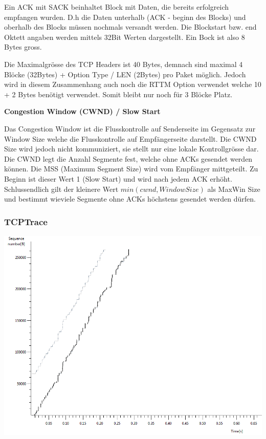 Ein ACK mit SACK beinhaltet Block mit Daten, die bereits erfolgreich empfangen
wurden. D.h die Daten unterhalb (ACK - beginn des Blocks) und oberhalb des
Blocks müssen nochmals versandt werden. Die Blockstart bzw. end Oktett angaben
werden mittels 32Bit Werten dargestellt. Ein Bock ist also 8 Bytes gross.

Die Maximalgrösse des TCP Headers ist 40 Bytes, demnach sind maximal 4 Blöcke
(32Bytes) + Option Type / LEN (2Bytes) pro Paket möglich. Jedoch wird in diesem
Zusammenhang auch noch die RTTM Option verwendet welche 10 + 2 Bytes benötigt
verwendet. Somit bleibt nur noch für 3 Blöcke Platz.

\textbf{Congestion Window (CWND) / Slow Start}

Das Congestion Window ist die Flusskontrolle auf Senderseite im Gegensatz zur
Window Size welche die Flusskontrolle auf Empfängerseite darstellt. Die CWND
Size wird jedoch nicht kommuniziert, sie stellt nur eine lokale Kontrollgrösse
dar. Die CWND legt die Anzahl Segmente fest, welche ohne ACKs gesendet werden
können. Die MSS (Maximum Segment Size) wird vom Empfänger mittgeteilt. Zu Beginn
ist dieser Wert 1 (Slow Start) und wird nach jedem ACK erhöht. Schlussendlich
gilt der kleinere Wert $min(cwnd,WindowSize)$ als MaxWin Size und bestimmt
wieviele Segmente ohne ACKs höchstens gesendet werden dürfen.

\subsubsection{TCPTrace}

\includegraphics[scale=0.45]{media/tcptraceUpload.png}

